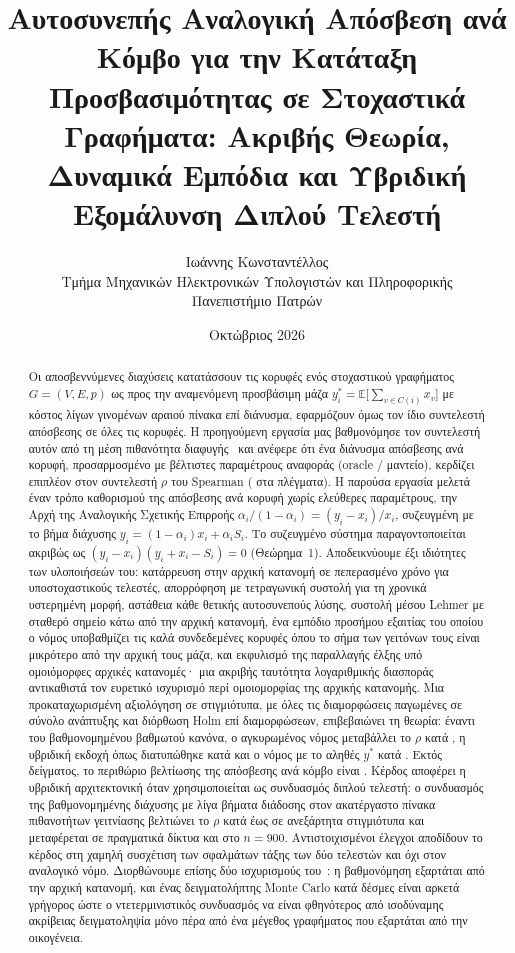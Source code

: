 \documentclass[11pt,a4paper]{article}
\title{\textbf{Αυτοσυνεπής Αναλογική Απόσβεση ανά Κόμβο για την Κατάταξη Προσβασιμότητας σε Στοχαστικά Γραφήματα: Ακριβής Θεωρία, Δυναμικά Εμπόδια και Υβριδική Εξομάλυνση Διπλού Τελεστή}}
\author{Ιωάννης Κωνσταντέλλος\\[2pt]
\small Τμήμα Μηχανικών Ηλεκτρονικών Υπολογιστών και Πληροφορικής\\
\small Πανεπιστήμιο Πατρών}
\date{Οκτώβριος 2026}
\theoremstyle{definition}
\theoremstyle{plain}
\newcommand{\E}{\mathbb{E}}
\begin{document}
\maketitle

\begin{abstract}
\noindent Οι αποσβεννύμενες διαχύσεις κατατάσσουν τις κορυφές ενός στοχαστικού γραφήματος $G=(V,E,p)$ ως προς την αναμενόμενη προσβάσιμη μάζα $y^*_i=\E\big[\sum_{v\in C(i)}x_v\big]$ με κόστος λίγων γινομένων αραιού πίνακα επί διάνυσμα, εφαρμόζουν όμως τον ίδιο συντελεστή απόσβεσης σε όλες τις κορυφές. Η προηγούμενη εργασία μας βαθμονόμησε τον συντελεστή αυτόν από τη μέση πιθανότητα διαφυγής~\cite{konstantellos26} και ανέφερε ότι ένα διάνυσμα απόσβεσης ανά κορυφή, προσαρμοσμένο με βέλτιστες παραμέτρους αναφοράς (oracle / μαντείο), κερδίζει επιπλέον \PrevHeadAll{} στον συντελεστή $\rho$ του Spearman (\PrevHeadGrid{} στα πλέγματα). Η παρούσα εργασία μελετά έναν τρόπο καθορισμού της απόσβεσης ανά κορυφή χωρίς ελεύθερες παραμέτρους, την Αρχή της Αναλογικής Σχετικής Επιρροής $\alpha_i/(1-\alpha_i)=(y_i-x_i)/x_i$, συζευγμένη με το βήμα διάχυσης $y_i=(1-\alpha_i)x_i+\alpha_iS_i$. Το συζευγμένο σύστημα παραγοντοποιείται ακριβώς ως $(y_i-x_i)(y_i+x_i-S_i)=0$ (Θεώρημα~1). Αποδεικνύουμε έξι ιδιότητες των υλοποιήσεών του: κατάρρευση στην αρχική κατανομή σε πεπερασμένο χρόνο για υποστοχαστικούς τελεστές, απορρόφηση με τετραγωνική συστολή για τη χρονικά υστερημένη μορφή, αστάθεια κάθε θετικής αυτοσυνεπούς λύσης, συστολή μέσου Lehmer με σταθερό σημείο κάτω από την αρχική κατανομή, ένα εμπόδιο προσήμου εξαιτίας του οποίου ο νόμος υποβαθμίζει τις καλά συνδεδεμένες κορυφές όπου το σήμα των γειτόνων τους είναι μικρότερο από την αρχική τους μάζα, και εκφυλισμό της παραλλαγής έλξης υπό ομοιόμορφες αρχικές κατανομές· μια ακριβής ταυτότητα λογαριθμικής διασποράς αντικαθιστά τον ευρετικό ισχυρισμό περί ομοιομορφίας της αρχικής κατανομής. Μια προκαταχωρισμένη αξιολόγηση σε \NTotal{} στιγμιότυπα, με όλες τις διαμορφώσεις παγωμένες σε σύνολο ανάπτυξης και διόρθωση Holm επί \NFrozen{} διαμορφώσεων, επιβεβαιώνει τη θεωρία: έναντι του βαθμονομημένου βαθμωτού κανόνα, ο αγκυρωμένος νόμος μεταβάλλει το $\rho$ κατά \TestAPoneD, η υβριδική εκδοχή όπως διατυπώθηκε κατά \TestPBXnomBD{} και ο νόμος με το αληθές $y^*$ κατά \TestTruePropD. Εκτός δείγματος, το περιθώριο βελτίωσης της απόσβεσης ανά κόμβο είναι \HeadAll. Κέρδος αποφέρει η υβριδική αρχιτεκτονική όταν χρησιμοποιείται ως συνδυασμός διπλού τελεστή: ο συνδυασμός της βαθμονομημένης διάχυσης με λίγα βήματα διάδοσης στον ακατέργαστο πίνακα πιθανοτήτων γειτνίασης βελτιώνει το $\rho$ κατά \TestPBXbestD{} έως \TestLinNineD{} σε ανεξάρτητα στιγμιότυπα και μεταφέρεται σε πραγματικά δίκτυα και στο $n=900$. Αντιστοιχισμένοι έλεγχοι αποδίδουν το κέρδος στη χαμηλή συσχέτιση των σφαλμάτων τάξης των δύο τελεστών και όχι στον αναλογικό νόμο. Διορθώνουμε επίσης δύο ισχυρισμούς του~\cite{konstantellos26}: η βαθμονόμηση εξαρτάται από την αρχική κατανομή, και ένας δειγματολήπτης Monte Carlo κατά δέσμες είναι αρκετά γρήγορος ώστε ο ντετερμινιστικός συνδυασμός να είναι φθηνότερος από ισοδύναμης ακρίβειας δειγματοληψία μόνο πέρα από ένα μέγεθος γραφήματος που εξαρτάται από την οικογένεια.
\end{abstract}
\end{document}
